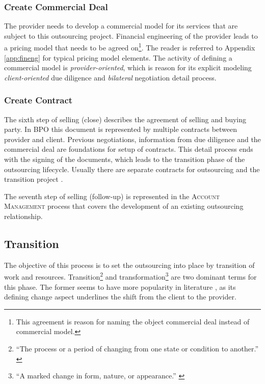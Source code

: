 	\subsubsection{Create Commercial Deal}
	
	The provider needs to develop a commercial model for its services that are subject to this outsourcing project. Financial engineering of the provider leads to a pricing model that needs to be agreed on\footnote{This agreement is reason for naming the object commercial deal instead of commercial model.}. The reader is referred to Appendix \ref{app:fineng} for typical pricing model elements. The activity of defining a commercial model is \textit{provider-oriented}, which is reason for its explicit modeling \wrt \textit{client-oriented} due diligence and \textit{bilateral} negotiation detail process. 
	
	\subsubsection{Create Contract}
	
	The sixth step of selling (close) describes the agreement of selling and buying party. In \acrshort{BPO} this document is represented by multiple contracts between provider and client. Previous negotiations, information from due diligence and the commercial deal are foundations for setup of contracts. This detail process ends with the signing of the documents, which leads to the transition phase of the outsourcing lifecycle. Usually there are separate contracts for outsourcing and the transition project \citep{bitkom2008}. 
	
	The seventh step of selling (follow-up) is represented in the \textsc{Account Management} process that covers the development of an existing outsourcing relationship. 
	
	
	\subsection{Transition}
		 \label{pr:tra}
	The objective of this process is to set the outsourcing into place by transition of work and resources. Transition\footnote{\enquote{The process or a period of changing from one state or condition to another.} \citep{oxfordtransition}} and transformation\footnote{\enquote{A marked change in form, nature, or appearance.} \citep{oxfordtransformation}} are two dominant terms for this phase. The former seems to have more popularity in literature \citep{perunovic2007outsourcing}, as its defining change aspect underlines the shift from the client to the provider. 
	

